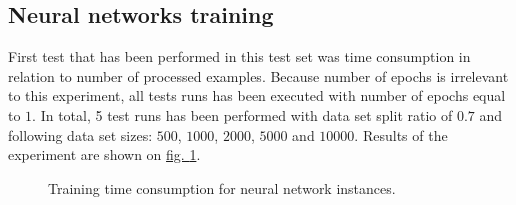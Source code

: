 \subsection{Neural networks training}\label{sec:neural-network-training}
First test that has been performed in this test set was time consumption in relation to number of processed examples. Because number of epochs is irrelevant to this experiment, all tests runs has been executed with number of epochs equal to $1$. In total, 5 test runs has been performed with data set split ratio of $0.7$ and following data set sizes: $500$, $1000$, $2000$, $5000$ and $10000$. Results of the experiment are shown on \hyperref[fig:training-time-consumpption]{fig. \ref*{fig:training-time-consumpption}}.
\begin{figure}
\centering
{}
\caption{Training time consumption for neural network instances.}
\label{fig:training-time-consumpption}
\end{figure}
